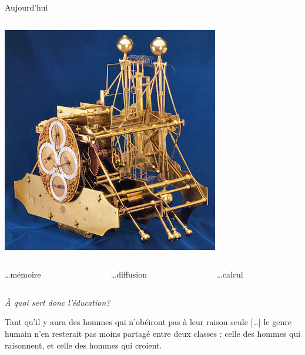\begin{frame}{Aujourd'hui}
\begin{columns}
\begin{column}{0.33\linewidth}
\centering
\includegraphics[height=0.35\paperheight]{../resources/illustrations/harrison} \\
\end{column}
\end{columns}

\vfill

\begin{columns}
\begin{column}{0.33\linewidth}
\centering
\ldots mémoire
\end{column}
\begin{column}{0.33\linewidth}
\centering
\ldots diffusion
\end{column}
\begin{column}{0.33\linewidth}
\centering
\ldots calcul
\end{column}
\end{columns}
\end{frame}
\begin{frame}
\vfill
\Huge 
\begin{center}
\emph{À quoi sert donc l'éducation?}
\end{center}
\vfill
\end{frame}
\begin{frame}
\vfill
\centering
\large
\begin{coolquote}
Tant qu'il y aura des hommes qui n'obéiront pas à leur raison seule [\ldots] le genre humain n'en resterait pas moins partagé entre deux classes : celle des hommes qui raisonnent, et celle 
des hommes qui croient.
\end{coolquote}
\vfill
\end{frame}